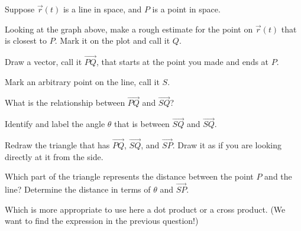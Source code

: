 \begin{problem}

\item Suppose $\vec{r}(t)$ is a line in space, and $P$ is a point in space.


  \begin{subproblem}
    \item Looking at the graph above, make a rough estimate for the point on $\vec{r}(t)$ that is closest to $P$. Mark it on the plot and call it $Q$.
    \item Draw a vector, call it $\vec{PQ}$, that starts at the point you made and ends at $P$.
    \item Mark an arbitrary point on the line, call it $S$.
    \item What is the relationship between $\vec{PQ}$ and $\vec{SQ}$?
      \vfill
    \item Identify and label the angle $\theta$ that is between $\vec{SQ}$ and $\vec{SQ}$.

    \clearpage

    \item Redraw the triangle that has $\vec{PQ}$, $\vec{SQ}$, and $\vec{SP}$. Draw it as if you are looking directly at it from the side.
      \vfill

    \item Which part of the triangle represents the distance between the point $P$ and the line? Determine the distance in terms of $\theta$ and $\vec{SP}$.
      \vfill

    \item Which is more appropriate to use here a dot product or a cross product. (We want to find the expression in the previous question!)
      \vfill


\end{subproblem}
\end{problem}
